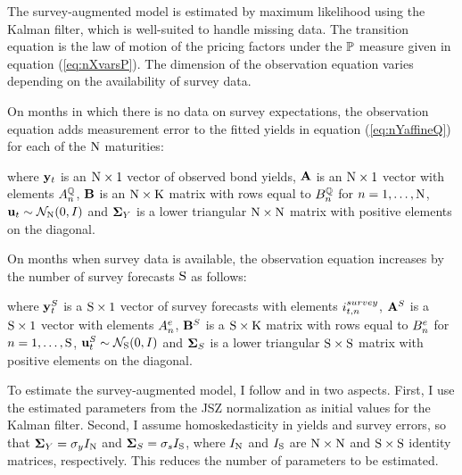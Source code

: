 {The survey-augmented model is estimated by maximum likelihood using the Kalman filter, which is well-suited to handle missing data. 
The transition equation is the law of motion of the pricing factors under the \(\mathbb{P}\) measure given in equation (\ref{eq:nXvarsP}).
The dimension of the observation equation varies depending on the availability of survey data. 

On months in which there is no data on survey expectations, the observation equation adds measurement error to the fitted yields in equation (\ref{eq:nYaffineQ}) for each of the \(\mathrm{N}\) maturities:
	
\noindent where \(\mathbf{y}_{t}\) is an \(\mathrm{N} \times 1\) vector of observed bond yields, \(\mathbf{A}\) is an \(\mathrm{N} \times 1\) vector with elements \(A_{n}^{\mathbb{Q}}\), \(\mathbf{B}\) is an \(\mathrm{N} \times \mathrm{K}\) matrix with rows equal to \(B_{n}^{\mathbb{Q}}\) for \(n = 1, \ldots, \mathrm{N}\), \(\mathbf{u}_{t} \sim \mathcal{N}_{\mathrm{N}} (0,I) \) and \(\mathbf{\mathbf{\Sigma}}_{Y}\) is a lower triangular \(\mathrm{N} \times \mathrm{N}\) matrix with positive elements on the diagonal.

On months when survey data is available, the observation equation increases by the number of survey forecasts \(\mathrm{S}\) as follows:
	
\noindent where \(\mathbf{y}_{t}^{S}\) is a \(\mathrm{S} \times 1\) vector of survey forecasts with elements \(i_{t,n}^{survey}\), \(\mathbf{A}^{S}\) is a \(\mathrm{S} \times 1\) vector with elements \(A_{n}^{e}\), \(\mathbf{B}^{S}\) is a \(\mathrm{S} \times \mathrm{K}\) matrix with rows equal to \(B_{n}^{e}\) for \(n = 1, \ldots, \mathrm{S}\), \(\mathbf{u}_{t}^{S} \sim \mathcal{N}_{\mathrm{S}} (0,I) \) and \(\mathbf{\mathbf{\Sigma}}_{S}\) is a lower triangular \(\mathrm{S} \times \mathrm{S}\) matrix with positive elements on the diagonal.

To estimate the survey-augmented model, I follow \cite{Guimaraes:2014} and \cite{Lloyd:2018b} in two aspects. First, I use the estimated parameters from the JSZ normalization as initial values for the Kalman filter.
Second, I assume homoskedasticity in yields and survey errors, so that \(\mathbf{\mathbf{\Sigma}}_{Y} = \sigma_y I_{\mathrm{N}}\) and \(\mathbf{\mathbf{\Sigma}}_{S} = \sigma_s I_{\mathrm{S}}\), where \(I_{\mathrm{N}}\) and \(I_{\mathrm{S}}\) are \(\mathrm{N} \times \mathrm{N}\) and \(\mathrm{S} \times \mathrm{S}\) identity matrices, respectively.
This reduces the number of parameters to be estimated.

}
